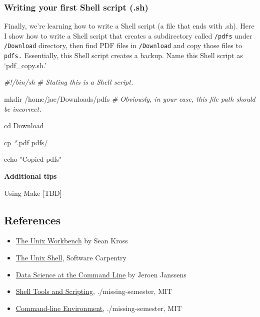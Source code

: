 \documentclass[
]{book}
\newenvironment{Shaded}{\begin{snugshade}}{\end{snugshade}}
\newcommand{\BuiltInTok}[1]{#1}
\newcommand{\CommentTok}[1]{\textcolor[rgb]{0.56,0.35,0.01}{\textit{#1}}}
\newcommand{\FunctionTok}[1]{\textcolor[rgb]{0.00,0.00,0.00}{#1}}
\newcommand{\NormalTok}[1]{#1}
\newcommand{\PreprocessorTok}[1]{\textcolor[rgb]{0.56,0.35,0.01}{\textit{#1}}}
\newcommand{\StringTok}[1]{\textcolor[rgb]{0.31,0.60,0.02}{#1}}
\begin{document}
\hypertarget{writing-your-first-shell-script-.sh}{%
\subsubsection{Writing your first Shell script (.sh)}\label{writing-your-first-shell-script-.sh}}

Finally, we're learning how to write a Shell script (a file that ends with .sh). Here I show how to write a Shell script that creates a subdirectory called \texttt{/pdfs} under \texttt{/Download} directory, then find PDF files in \texttt{/Download} and copy those files to \texttt{pdfs.} Essentially, this Shell script creates a backup. Name this Shell script as `pdf\_copy.sh.'

\begin{Shaded}
\begin{Highlighting}[]

\CommentTok{\#!/bin/sh \# Stating this is a Shell script. }

\FunctionTok{mkdir}\NormalTok{ /home/jae/Downloads/pdfs }\CommentTok{\# Obviously, in your case, this file path should be incorrect.}

\BuiltInTok{cd}\NormalTok{ Download}

\FunctionTok{cp} \PreprocessorTok{*}\NormalTok{.pdf pdfs/ }

\BuiltInTok{echo} \StringTok{"Copied pdfs"}
\end{Highlighting}
\end{Shaded}

\textbf{Additional tips}

Using Make {[}TBD{]}

\hypertarget{references}{%
\subsection{References}\label{references}}

\begin{itemize}
\item
  \href{https://seankross.com/the-unix-workbench/}{The Unix Workbench} by Sean Kross
\item
  \href{http://swcarpentry.GitHub.io/shell-novice/}{The Unix Shell}, Software Carpentry
\item
  \href{https://www.datascienceatthecommandline.com/1e/}{Data Science at the Command Line} by Jeroen Janssens
\end{itemize}

\begin{itemize}
\item
  \href{https://missing.csail.mit.edu/2020/shell-tools/}{Shell Tools and Scripting}, ./missing-semester, MIT
\item
  \href{https://missing.csail.mit.edu/2020/command-line/}{Command-line Environment}, ./missing-semester, MIT
\end{itemize}
\end{document}
